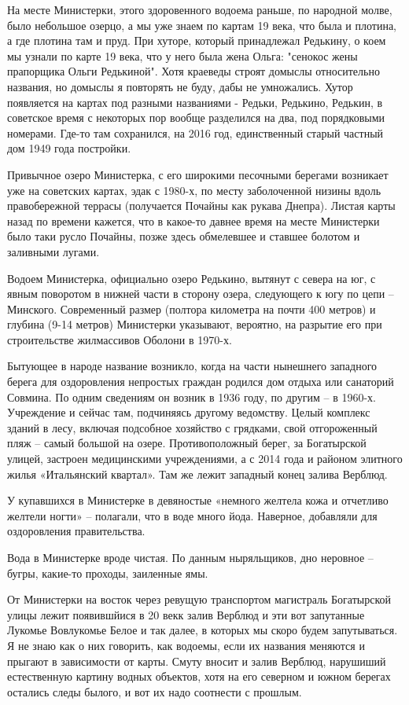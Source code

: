На месте Министерки, этого здоровенного водоема раньше, по народной молве, было небольшое озерцо, а мы уже знаем по картам 19 века, что была и плотина, а где плотина там и пруд. При хуторе, который принадлежал Редькину, о коем мы узнали по карте 19 века, что у него была жена Ольга: "сенокос жены прапорщика Ольги Редькиной". Хотя краеведы строят домыслы относительно названия, но домыслы я повторять не буду, дабы не умножались. Хутор появляется на картах под разными названиями - Редьки, Редькино, Редькин, в советское время с некоторых пор вообще разделился на два, под порядковыми номерами. Где-то там сохранился, на 2016 год, единственный старый частный дом 1949 года постройки. 

Привычное озеро Министерка, с его широкими песочными берегами возникает уже на советских картах, эдак с 1980-х, по месту заболоченной низины вдоль правобережной террасы (получается Почайны как рукава Днепра). Листая карты назад по времени кажется, что в какое-то давнее время на месте Министерки было таки русло Почайны, позже здесь обмелевшее и ставшее болотом и заливными лугами.

Водоем Министерка, официально озеро Редькино, вытянут с севера на юг, с явным поворотом в нижней части в сторону озера, следующего к югу по цепи – Минского. Современный размер (полтора километра на почти 400 метров) и глубина (9-14 метров) Министерки указывают, вероятно, на разрытие его при строительстве жилмассивов Оболони в 1970-х.

Бытующее в народе название возникло, когда на части нынешнего западного берега для оздоровления непростых граждан родился дом отдыха или санаторий Совмина. По одним сведениям он возник в 1936 году, по другим – в 1960-х. Учреждение и сейчас там, подчиняясь другому ведомству. Целый комплекс зданий в лесу, включая подсобное хозяйство с грядками, свой отгороженный пляж – самый большой на озере. Противоположный берег, за Богатырской улицей, застроен медицинскими учреждениями, а с 2014 года и районом элитного жилья «Итальянский квартал». Там же лежит западный конец залива Верблюд.

У купавшихся в Министерке в девяностые «немного желтела кожа и отчетливо желтели ногти» – полагали, что в воде много йода. Наверное, добавляли для оздоровления правительства. 

Вода в Министерке вроде чистая. По данным ныряльщиков, дно неровное – бугры, какие-то проходы, заиленные ямы.

От Министерки на восток через ревущую транспортом магистраль Богатырской улицы лежит появившйися в 20 векк залив Верблюд и эти вот запутанные Лукомье Вовлукомье Белое и так далее, в которых мы скоро будем запутываться. Я не знаю как о них говорить, как водоемы, если их названия меняются и прыгают в зависимости от карты. Смуту вносит и залив Верблюд, нарушиший естественную картину водных объектов, хотя на его северном и южном берегах остались следы былого, и вот их надо соотнести с прошлым.

